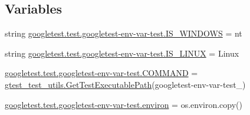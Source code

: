 \subsection*{Variables}
\begin{DoxyCompactItemize}
\item 
string \mbox{\hyperlink{namespacegoogletest_1_1test_1_1googletest-env-var-test_a49ac60f802f403b1610944753da95490}{googletest.\+test.\+googletest-\/env-\/var-\/test.\+I\+S\+\_\+\+W\+I\+N\+D\+O\+WS}} = \textquotesingle{}nt\textquotesingle{}
\item 
string \mbox{\hyperlink{namespacegoogletest_1_1test_1_1googletest-env-var-test_a594f790397f9fe6b0bac6c59d7645b10}{googletest.\+test.\+googletest-\/env-\/var-\/test.\+I\+S\+\_\+\+L\+I\+N\+UX}} = \textquotesingle{}Linux\textquotesingle{}
\item 
\mbox{\hyperlink{namespacegoogletest_1_1test_1_1googletest-env-var-test_a657d0124a8f8f4483cb4b7b2b33637f0}{googletest.\+test.\+googletest-\/env-\/var-\/test.\+C\+O\+M\+M\+A\+ND}} = \mbox{\hyperlink{namespacegtest__test__utils_a89ed3717984a80ffbb7a9c92f71b86a2}{gtest\+\_\+test\+\_\+utils.\+Get\+Test\+Executable\+Path}}(\textquotesingle{}googletest-\/env-\/var-\/test\+\_\+\textquotesingle{})
\item 
\mbox{\hyperlink{namespacegoogletest_1_1test_1_1googletest-env-var-test_ae59e036a7b2f2404c117dffd12237ae7}{googletest.\+test.\+googletest-\/env-\/var-\/test.\+environ}} = os.\+environ.\+copy()
\end{DoxyCompactItemize}
